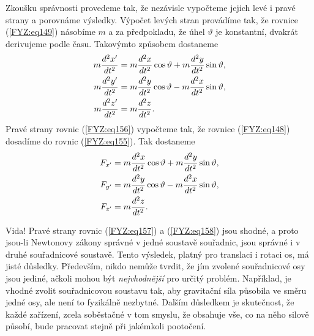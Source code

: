     Zkoušku správnosti provedeme tak, že nezávisle vypočteme jejich levé i pravé strany a porovnáme 
    výsledky. Výpočet levých stran provádíme tak, že rovnice (\ref{FYZ:eq149}) násobíme \(m\) a za 
    předpokladu, že úhel \(\vartheta\) je konstantní, dvakrát derivujeme podle času. Takovýmto 
    způsobem dostaneme
    \begin{subequations}
      \label{FYZ:eq157}
      \begin{align}
        m\dfrac{d^2 x'}{d t^2} &= 
          m\dfrac{d^2 x}{d t^2}\cos\vartheta + m\dfrac{d^2 y}{d t^2}\sin\vartheta, \label{FYZ:eq157a}\\
        m\dfrac{d^2 y'}{d t^2} &= 
          m\dfrac{d^2 y}{d t^2}\cos\vartheta - m\dfrac{d^2 x}{d t^2}\sin\vartheta, \label{FYZ:eq157b}\\
        m\dfrac{d^2 z'}{d t^2} &= 
          m\dfrac{d^2 z}{d t^2}.                                          \label{FYZ:eq157c}
      \end{align}
    \end{subequations}
    Pravé strany rovnic (\ref{FYZ:eq156}) vypočteme tak, že rovnice (\ref{FYZ:eq148}) dosadíme do 
    rovnic (\ref{FYZ:eq155}). Tak dostaneme
    \begin{subequations}
      \label{FYZ:eq158}
      \begin{align}
        F_{x'} &= m\dfrac{d^2 x}{d t^2}\cos\vartheta + m\dfrac{d^2 y}{d t^2}\sin\vartheta, \label{FYZ:eq158a}\\
        F_{y'} &= m\dfrac{d^2 y}{d t^2}\cos\vartheta - m\dfrac{d^2 x}{d t^2}\sin\vartheta, \label{FYZ:eq158b}\\
        F_{z'} &= m\dfrac{d^2 z}{d t^2}.                                          \label{FYZ:eq158c}
      \end{align}
    \end{subequations}
    
    Vida! Pravé strany rovnic (\ref{FYZ:eq157}) a (\ref{FYZ:eq158}) jsou shodné, a proto jsou-li 
    Newtonovy zákony správné v jedné soustavě souřadnic, jsou správné i v druhé souřadnicové 
    soustavě. Tento výsledek, platný pro translaci i rotaci os, má jisté důsledky. Především, nikdo 
    nemůže tvrdit, že jím zvolené souřadnicové osy jsou jediné, ačkoli mohou být 
    \emph{nejvhodnější} pro určitý problém. Například, je vhodné zvolit souřadnicovou soustavu tak, 
    aby gravitační síla působila ve směru jedné osy, ale není to fyzikálně nezbytné. Dalším 
    důsledkem je skutečnost, že každé zařízení, zcela soběstačné v tom smyslu, že obsahuje vše, co 
    na něho silově působí, bude pracovat stejně při jakémkoli pootočení.
    
